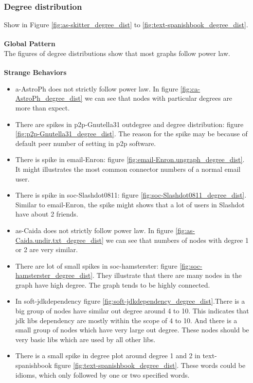
\subsubsection{Degree distribution}

Show in Figure \ref{fig:as-skitter_degree_dist} to  \ref{fig:text-spanishbook_degree_dist}. \\
\\
\textbf{Global Pattern} \\
The figures of degree distributions show that most graphs follow power law. \\
\\
\textbf{Strange Behaviors} \\
\begin{itemize} 
\item a-AstroPh does not strictly follow power law. In figure \ref{fig:ca-AstroPh_degree_dist} we can see that nodes with particular degrees are more than expect. \\
\item There are spikes in p2p-Gnutella31 outdegree and degree distribution: figure \ref{fig:p2p-Gnutella31_degree_dist}. The reason for the spike may be because of default peer number of setting in p2p software. \\
\item There is spike in email-Enron: figure \ref{fig:email-Enron.ungraph_degree_dist}. It might illustrates the most common connector numbers of a normal email user.\\
\item There is spike in soc-Slashdot0811: figure \ref{fig:soc-Slashdot0811_degree_dist}. Similar to email-Enron, the spike might shows that a lot of users in Slashdot have about 2 friends.\\
\item as-Caida does not strictly follow power law. In figure \ref{fig:as-Caida.undir.txt_degree_dist} we can see that numbers of nodes with degree 1 or 2 are very similar. \\
\item There are lot of small spikes in soc-hamsterster: figure \ref{fig:soc-hamsterster_degree_dist}. They illustrate that there are many nodes in the graph have high degree. The graph tends to be highly connected.\\
\item In soft-jdkdependency figure \ref{fig:soft-jdkdependency_degree_dist}.There is a big group of nodes have similar out degree around 4 to 10. This indicates that jdk libs dependency are mostly within the scope of 4 to 10. And there is a small group of nodes which have very large out degree. These nodes should be very basic libs which are used by all other libs.\\
\item There is a small spike in degree plot around degree 1 and 2 in text-spanishbook figure \ref{fig:text-spanishbook_degree_dist}. These words could be idioms, which only followed by one or two specified words.
\end{itemize}

